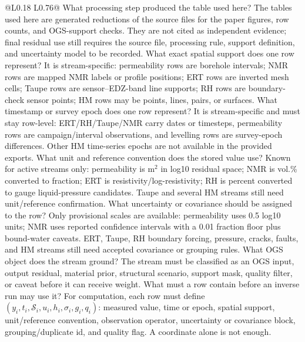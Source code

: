 \begin{longtable}{@{}L{0.18\textwidth} L{0.76\textwidth}@{}}
{ What processing step produced the table used here?}
{The tables used here are generated reductions of the source files for the paper
figures, row counts, and OGS-support checks.  They are not cited as independent
evidence; final residual use still requires the source file, processing rule,
support definition, and uncertainty model to be recorded.}
{ What exact spatial support does one row represent?}
{It is stream-specific: permeability rows are borehole intervals; NMR rows are
mapped NMR labels or profile positions; ERT rows are inverted mesh cells; Taupe rows
are sensor--EDZ-band line supports; RH rows are boundary-check sensor points; HM rows
may be points, lines, pairs, or surfaces.}
{ What timestamp or survey epoch does one row represent?}
{It is stream-specific and must stay row-level: ERT/RH/Taupe/NMR carry dates or
timesteps, permeability rows are campaign/interval observations, and levelling rows
are survey-epoch differences.  Other HM time-series epochs are not available in the
provided exports.}
{ What unit and reference convention does the stored value use?}
{Known for active streams only: permeability is \(\mathrm{m^2}\) in log10 residual
space; NMR is vol.\% converted to fraction; ERT is resistivity/log-resistivity;
RH is percent converted to gauge liquid-pressure candidates.  Taupe and several HM
streams still need unit/reference confirmation.}
{ What uncertainty or covariance should be assigned to the row?}
{Only provisional scales are available: permeability uses 0.5 log10 units; NMR uses
reported confidence intervals with a 0.01 fraction floor plus bound-water caveats.
ERT, Taupe, RH boundary forcing, pressure, cracks, faults, and HM streams still need
accepted covariance or grouping rules.}
{ What OGS object does the stream ground?}
{The stream must be classified as an OGS input, output residual, material prior,
structural scenario, support mask, quality filter, or caveat before it can receive
weight.}
{ What must a row contain before an inverse run may use it?}
{For computation, each row must define
\((y_i,t_i,\mathcal S_i,u_i,h_i,\sigma_i,g_i,q_i)\): measured value, time or epoch,
spatial support, unit/reference convention, observation operator, uncertainty or
covariance block, grouping/duplicate id, and quality flag.  A coordinate alone is
not enough.}

\end{longtable}

